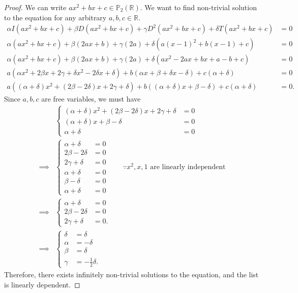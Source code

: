 \documentclass{article}
\begin{document}
\begin{proof}
    We can write $ax^2 + bx + c \in\mathbb{P}_2(\mathbb{R})$. We want to find non-trivial solution 
    to the equation for any arbitrary $a, b, c \in\mathbb{R}$.
    \begin{align*}
        \alpha I(ax^2+bx+c) + \beta D(ax^2+bx+c) + \gamma D^2(ax^2+bx+c) + \delta T(ax^2+bx+c) & = 0 \\
        \alpha(ax^2+bx+c) + \beta(2ax+b) + \gamma(2a) + \delta(a(x-1)^2+b(x-1)+c) & = 0 \\
        \alpha(ax^2+bx+c) + \beta(2ax+b) + \gamma(2a) + \delta(ax^2-2ax+bx+a-b+c) & = 0 \\
        a(\alpha x^2+2\beta x+2\gamma+\delta x^2-2\delta x+\delta) + b(\alpha x +\beta +\delta x-\delta) 
        + c(\alpha + \delta) & = 0 \\
        a\left((\alpha+\delta)x^2+(2\beta-2\delta)x+2\gamma+\delta\right) + b\left((\alpha+\delta)x
        +\beta-\delta\right) + c(\alpha+\delta) & = 0.
    \end{align*}
    Since $a,b,c$ are free variables, we must have 
    \begin{align*}
        & \begin{cases}
            (\alpha+\delta)x^2+(2\beta-2\delta)x+2\gamma+\delta & = 0 \\
            (\alpha+\delta)x+\beta-\delta & = 0 \\
            \alpha + \delta & = 0
        \end{cases} \\
        \implies & \begin{cases}
            \alpha+\delta & = 0 \\
            2\beta-2\delta & = 0 \\
            2\gamma + \delta & = 0 \\
            \alpha + \delta & = 0 \\
            \beta - \delta & = 0 \\
            \alpha + \delta & = 0
        \end{cases} \qquad \because x^2, x, 1 \text{ are linearly independent}\\
        \implies & \begin{cases}
            \alpha+\delta & = 0 \\
            2\beta-2\delta & = 0 \\
            2\gamma + \delta & = 0.
        \end{cases} \\
        \implies & \begin{cases}
            \delta & = \delta \\
            \alpha & = -\delta \\
            \beta & = \delta \\
            \gamma & = -\frac{1}{2}\delta.
        \end{cases}
    \end{align*}
    Therefore, there exists infinitely non-trivial solutions to the equation, and the list is 
    linearly dependent.
\end{proof}
\end{document}
